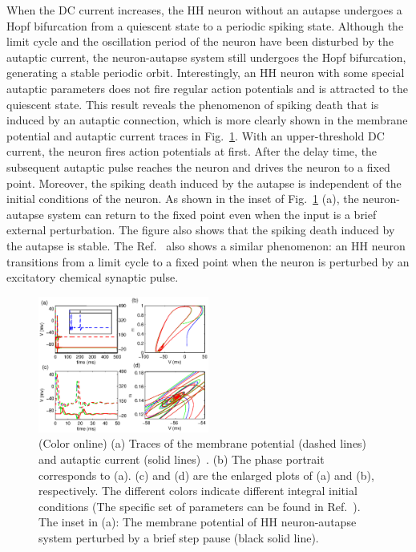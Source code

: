 \documentclass[twocolumn,showpacs,preprintnumbers,amsmath,amssymb,pre,superscriptaddress]{revtex4-1}
\begin{document}
\begin{CJK}{UTF8}{gbsn}
When the DC current increases, the HH neuron without an autapse undergoes a Hopf bifurcation from a quiescent state to a periodic spiking state. Although the limit cycle and the oscillation period of the neuron have been disturbed by the autaptic current, the neuron-autapse system still undergoes the Hopf bifurcation, generating a stable periodic orbit. Interestingly, an HH neuron with some special autaptic parameters does not fire regular action potentials and is attracted to the quiescent state. This result reveals the phenomenon of spiking death that is induced by an autaptic connection, which is more clearly shown in the membrane potential and autaptic current traces in Fig.~\ref{rfig4_v}. With an upper-threshold DC current, the neuron fires action potentials at first. After the delay time, the subsequent autaptic pulse reaches the neuron and drives the neuron to a fixed point. Moreover, the spiking death induced by the autapse is independent of the initial conditions of the neuron. As shown in the inset of Fig.~\ref{rfig4_v} (a), the neuron-autapse system can return to the fixed point even when the input is a brief external perturbation. The figure also shows that the spiking death induced by the autapse is stable. The Ref.~\cite{sjw} also shows a similar phenomenon: an HH neuron transitions from a limit cycle to a fixed point when the neuron is perturbed by an excitatory chemical synaptic pulse.

\begin{figure}
\begin{center}
\includegraphics[width=0.5\textwidth]{fig9_bifurcation_stable_point.eps}
\caption{(Color online) (a) Traces of the membrane potential (dashed lines) and autaptic current (solid lines)~\cite{wht_chaos}. (b) The phase portrait corresponds to (a). (c) and (d) are the enlarged plots of (a) and (b), respectively. The different colors indicate different integral initial conditions (The specific set of parameters can be found in Ref.~\cite{wht_chaos}). The inset in (a): The membrane potential of HH neuron-autapse system perturbed by a brief step pause (black solid line).} 
\label{rfig4_v}
\end{center}
\end{figure}


\end{CJK}
\end{document}
